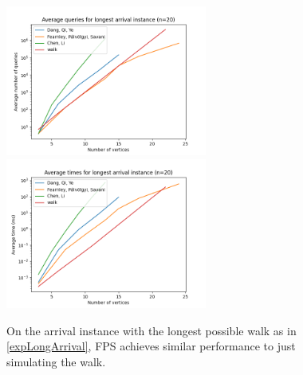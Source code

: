   \vspace{-22pt}
  \begin{figure}[H]
      \centering
      \includegraphics[width=2.6in]{plots/arrival_long_queries.png}
      \centering
      \includegraphics[width=2.6in]{plots/arrival_long_times.png}
      \caption{ On the arrival instance with the longest possible walk as in \cref{expLongArrival},
      FPS achieves similar performance to just simulating the walk.} \label{arrivalLongPlot}
  \end{figure}
  
